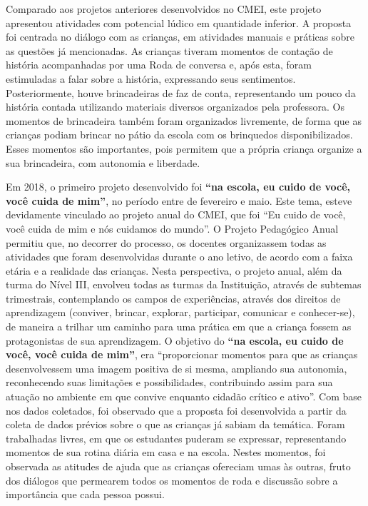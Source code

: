 \begin{refsection}
    Comparado aos projetos anteriores desenvolvidos no CMEI, este projeto apresentou atividades com potencial lúdico em quantidade inferior. A proposta foi centrada no diálogo com as crianças, em atividades manuais e práticas sobre as questões já mencionadas. As crianças tiveram momentos de contação de história acompanhadas por uma Roda de conversa e, após esta, foram estimuladas a falar sobre a história, expressando seus sentimentos. Posteriormente, houve brincadeiras de faz de conta, representando um pouco da história contada utilizando materiais diversos organizados pela professora. Os momentos de brincadeira também foram organizados livremente, de forma que as crianças podiam brincar no pátio da escola com os brinquedos disponibilizados. Esses momentos são importantes, pois permitem que a própria criança organize a sua brincadeira, com autonomia e liberdade.  

    Em 2018, o primeiro projeto desenvolvido foi \textbf{“na escola, eu cuido de você, você cuida de mim”}, no período entre de fevereiro e maio. Este tema, esteve devidamente vinculado ao projeto anual do CMEI, que foi “Eu cuido de você, você cuida de mim e nós cuidamos do mundo”. O Projeto Pedagógico Anual permitiu que, no decorrer do processo, os docentes organizassem todas as atividades que foram desenvolvidas durante o ano letivo, de acordo com a faixa etária e a realidade das crianças. Nesta perspectiva, o projeto anual, além da turma do Nível III, envolveu todas as turmas da Instituição, através de subtemas trimestrais, contemplando os campos de experiências, através dos direitos de aprendizagem (conviver, brincar, explorar, participar, comunicar e conhecer-se), de maneira a trilhar um caminho para uma prática em que a criança fossem as protagonistas de sua aprendizagem. O objetivo do \textbf{“na escola, eu cuido de você, você cuida de mim”}, era “proporcionar momentos para que as crianças desenvolvessem uma imagem positiva de si mesma, ampliando sua autonomia, reconhecendo suas limitações e possibilidades, contribuindo assim para sua atuação no ambiente em que convive enquanto cidadão crítico e ativo”. Com base nos dados coletados, foi observado que a proposta foi desenvolvida a partir da coleta de dados prévios sobre o que as crianças já sabiam da temática. Foram trabalhadas livres, em que os estudantes puderam se expressar, representando momentos de sua rotina diária em casa e na escola. Nestes momentos, foi observada as atitudes de ajuda que as crianças ofereciam umas às outras, fruto dos diálogos que permearem todos os momentos de roda e discussão sobre a importância que cada pessoa possui.  


\end{refsection}

